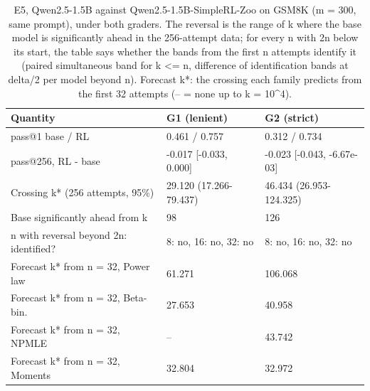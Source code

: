 \begin{table}[t]
\centering
\small
\begin{tabular}{p{1.9in}p{1.7in}p{1.7in}}
\toprule
Quantity & G1 (lenient) & G2 (strict) \\
\midrule
pass@1 base / RL & 0.461 / 0.757 & 0.312 / 0.734 \\
pass@256, RL - base & -0.017 [-0.033, 0.000] & -0.023 [-0.043, -6.67e-03] \\
Crossing k* (256 attempts, 95\%) & 29.120 (17.266-79.437) & 46.434 (26.953-124.325) \\
Base significantly ahead from k & 98 & 126 \\
n with reversal beyond 2n: identified? & 8: no, 16: no, 32: no & 8: no, 16: no, 32: no \\
Forecast k* from n = 32, Power law & 61.271 & 106.068 \\
Forecast k* from n = 32, Beta-bin. & 27.653 & 40.958 \\
Forecast k* from n = 32, NPMLE & -- & 43.742 \\
Forecast k* from n = 32, Moments & 32.804 & 32.972 \\
\bottomrule
\end{tabular}
\caption{E5, Qwen2.5-1.5B against Qwen2.5-1.5B-SimpleRL-Zoo on GSM8K (m = 300, same prompt), under both graders. The reversal is the range of k where the base model is significantly ahead in the 256-attempt data; for every n with 2n below its start, the table says whether the bands from the first n attempts identify it (paired simultaneous band for k <= n, difference of identification bands at delta/2 per model beyond n). Forecast k*: the crossing each family predicts from the first 32 attempts (-- = none up to k = 10^4).}
\label{tab:T11_crossing_pair}
\end{table}

